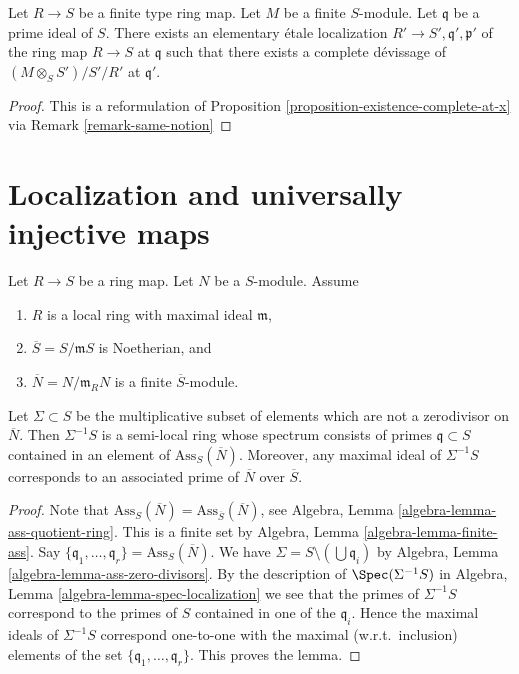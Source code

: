 \begin{lemma}
\label{lemma-existence-algebra}
Let $R \to S$ be a finite type ring map.
Let $M$ be a finite $S$-module.
Let $\mathfrak q$ be a prime ideal of $S$.
There exists an elementary \'etale localization
$R' \to S', \mathfrak q', \mathfrak p'$ of
the ring map $R \to S$ at $\mathfrak q$ such that
there exists a complete d\'evissage of
$(M \otimes_S S')/S'/R'$ at $\mathfrak q'$.
\end{lemma}

\begin{proof}
This is a reformulation of
Proposition \ref{proposition-existence-complete-at-x}
via
Remark \ref{remark-same-notion}
\end{proof}




\section{Localization and universally injective maps}
\label{section-localize-universally-injective}


\begin{lemma}
\label{lemma-homothety-spectrum}
Let $R \to S$ be a ring map.
Let $N$ be a $S$-module.
Assume
\begin{enumerate}
\item $R$ is a local ring with maximal ideal $\mathfrak m$,
\item $\overline{S} = S/\mathfrak m S$ is Noetherian, and
\item $\overline{N} = N/\mathfrak m_R N$ is a finite $\overline{S}$-module.
\end{enumerate}
Let $\Sigma \subset S$ be the multiplicative subset of elements which are not
a zerodivisor on $\overline{N}$. Then $\Sigma^{-1}S$ is a semi-local ring
whose spectrum consists of primes $\mathfrak q \subset S$ contained in an
element of $\text{Ass}_S(\overline{N})$. Moreover, any maximal
ideal of $\Sigma^{-1}S$ corresponds to an associated prime of
$\overline{N}$ over $\overline{S}$.
\end{lemma}

\begin{proof}
Note that
$\text{Ass}_S(\overline{N}) = \text{Ass}_{\overline{S}}(\overline{N})$, see
Algebra, Lemma \ref{algebra-lemma-ass-quotient-ring}.
This is a finite set by
Algebra, Lemma \ref{algebra-lemma-finite-ass}.
Say $\{\mathfrak q_1, \ldots, \mathfrak q_r\} = \text{Ass}_S(\overline{N})$.
We have $\Sigma = S \setminus (\bigcup \mathfrak q_i)$ by
Algebra, Lemma \ref{algebra-lemma-ass-zero-divisors}.
By the description of $\Spec(\Sigma^{-1}S)$ in
Algebra, Lemma \ref{algebra-lemma-spec-localization}
we see that the primes of $\Sigma^{-1}S$ correspond to the primes of
$S$ contained in one of the $\mathfrak q_i$.
Hence the maximal ideals of $\Sigma^{-1}S$ correspond one-to-one with the
maximal (w.r.t.\ inclusion) elements of the set
$\{\mathfrak q_1, \ldots, \mathfrak q_r\}$. This proves the lemma.
\end{proof}

